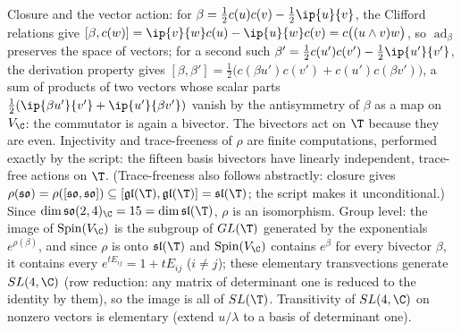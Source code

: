 Closure and the vector action: for $\beta = \tfrac12 c(u)c(v) - \tfrac12\ip{u}{v}$, the Clifford relations give $[\beta, c(w)] = \ip{v}{w}c(u) - \ip{u}{w}c(v) = c\bigl((u\wedge v)w\bigr)$, so $\operatorname{ad}_\beta$ preserves the space of vectors; for a second such $\beta'= \tfrac12 c(u')c(v') - \tfrac12\ip{u'}{v'}$, the derivation property gives $[\beta, \beta'] = \tfrac12\bigl(c(\beta u')c(v') + c(u')c(\beta v')\bigr)$, a sum of products of two vectors whose scalar parts $\tfrac12(\ip{\beta u'}{v'} + \ip{u'}{\beta v'})$ vanish by the antisymmetry of $\beta$ as a map on $V_\C$: the commutator is again a bivector. The bivectors act on $\T$ because they are even. Injectivity and trace-freeness of $\rho$ are finite computations, performed exactly by the script: the fifteen basis bivectors have linearly independent, trace-free actions on $\T$. (Trace-freeness also follows abstractly: closure gives $\rho(\mathfrak{so}) = \rho([\mathfrak{so},\mathfrak{so}]) \subseteq [\mathfrak{gl}(\T), \mathfrak{gl}(\T)] = \mathfrak{sl}(\T)$; the script makes it unconditional.) Since $\dim \mathfrak{so}(2,4)_\C = 15 = \dim\mathfrak{sl}(\T)$, $\rho$ is an isomorphism. Group level: the image of $\mathrm{Spin}(V_\C)$ is the subgroup of $GL(\T)$ generated by the exponentials $e^{\rho(\beta)}$, and since $\rho$ is onto $\mathfrak{sl}(\T)$ and $\mathrm{Spin}(V_\C)$ contains $e^{\beta}$ for every bivector $\beta$, it contains every $e^{tE_{ij}} = 1 + tE_{ij}$ ($i \neq j$); these elementary transvections generate $SL(4,\C)$ (row reduction: any matrix of determinant one is reduced to the identity by them), so the image is all of $SL(\T)$. Transitivity of $SL(4,\C)$ on nonzero vectors is elementary (extend $u/\lambda$ to a basis of determinant one).
